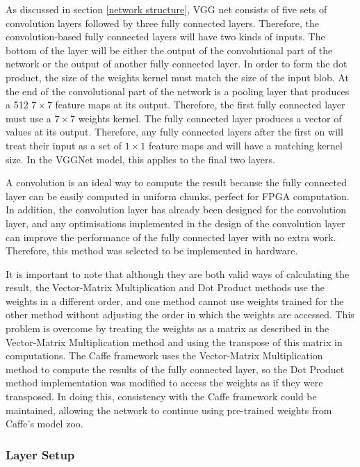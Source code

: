 \documentclass[12pt]{article}
\begin{document}
As discussed in section \ref{network structure}, VGG net consists of five sets of convolution layers followed by three fully connected layers. Therefore, the convolution-based fully connected layers will have two kinds of inputs. The bottom of the layer will be either the output of the convolutional part of the network or the output of another fully connected layer. In order to form the dot product, the size of the weights kernel must match the size of the input blob. At the end of the convolutional part of the network is a pooling layer that produces a 512 $7 \times 7$ feature maps at its output. Therefore, the first fully connected layer must use a $7 \times 7$ weights kernel. The fully connected layer produces a vector of values at its output. Therefore, any fully connected layers after the first on will treat their input as a set of $1 \times 1$ feature maps and will have a matching kernel size. In the VGGNet model, this applies to the final two layers.

A convolution is an ideal way to compute the result because the fully connected layer can be easily computed in uniform chunks, perfect for FPGA computation. In addition, the convolution layer has already been designed for the convolution layer, and any optimisations implemented in the design of the convolution layer can improve the performance of the fully connected layer with no extra work. Therefore, this method was selected to be implemented in hardware.

It is important to note that although they are both valid ways of calculating the result, the Vector-Matrix Multiplication and Dot Product methods use the weights in a different order, and one method cannot use weights trained for the other method without adjusting the order in which the weights are accessed. This problem is overcome by treating the weights as a matrix as described in the Vector-Matrix Multiplication method and using the transpose of this matrix in computations. The Caffe framework uses the Vector-Matrix Multiplication method to compute the results of the fully connected layer, so the Dot Product method implementation was modified to access the weights as if they were transposed. In doing this, consistency with the Caffe framework could be maintained, allowing the network to continue using pre-trained weights from Caffe's model zoo.

\subsubsection{Layer Setup}
\label{sec:Design-FC-Setup}
\end{document}
